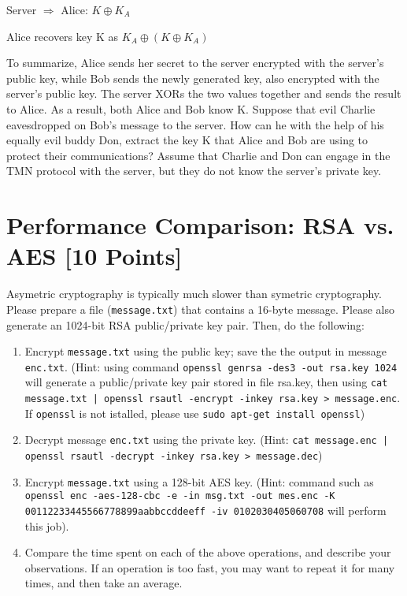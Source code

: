 \documentclass[11pt]{article}
\begin{document}
	Server $\Rightarrow$ Alice:  $K\oplus K_A$

	Alice recovers key K as $K_A\oplus (K\oplus K_A)$

To summarize, Alice sends her secret to the server encrypted with the server's public key, while Bob sends the newly generated key, also encrypted with the server's public key. The server XORs the two values together and sends the result to Alice. As a result, both Alice and Bob know K.
Suppose that evil Charlie eavesdropped on Bob's message to the server. How can he with the help of his equally evil buddy Don, extract the key K that Alice and Bob are using to protect their communications? Assume that Charlie and Don can engage in the TMN protocol with the server, but they do not know the server's private key.


\vspace{1in}




\section{Performance Comparison: RSA vs. AES [10 Points]}
Asymetric cryptography is typically much slower than symetric cryptography. Please prepare a file (\texttt{message.txt})
that contains a 16-byte message. Please also generate an 1024-bit RSA public/private key pair. Then, do the
following:
\begin{enumerate}
\item Encrypt \texttt{message.txt} using the public key; save the the output in message \texttt{enc.txt}.
(Hint: using command \texttt{openssl genrsa -des3 -out rsa.key 1024} will generate a public/private key pair stored in file rsa.key, then using \texttt{cat message.txt | openssl rsautl -encrypt -inkey rsa.key > message.enc}. If \texttt{openssl} is not istalled, please use \texttt{sudo apt-get install openssl})
\item Decrypt message \texttt{enc.txt} using the private key. (Hint: \texttt{cat message.enc | openssl rsautl -decrypt -inkey rsa.key > message.dec})
\item Encrypt \texttt{message.txt} using a 128-bit AES key. (Hint: command such as \texttt{openssl enc -aes-128-cbc -e -in msg.txt -out mes.enc -K} \\ \texttt{00112233445566778899aabbccddeeff -iv 0102030405060708} will perform this job).
\item Compare the time spent on each of the above operations, and describe your observations. If an operation is too fast, you may want to repeat it for many times, and then take an average.
\end{enumerate}
\end{document}
